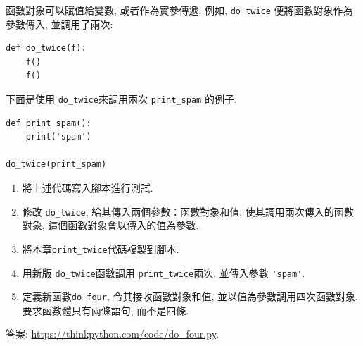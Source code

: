\documentclass[10pt]{book}
\begin{document}
\begin{exercise}

函數對象可以賦值給變數, 或者作為實參傳遞. 
例如, \verb"do_twice" 便將函數對象作為參數傳入, 並調用了兩次:

\begin{verbatim}
def do_twice(f):
    f()
    f()
\end{verbatim}

下面是使用 \verb"do_twice"來調用兩次 \verb"print_spam" 的例子. 

\begin{verbatim}
def print_spam():
    print('spam')

do_twice(print_spam)
\end{verbatim}

\begin{enumerate}

\item 將上述代碼寫入腳本進行測試.

\item 修改 \verb"do_twice", 給其傳入兩個參數：函數對象和值, 
使其調用兩次傳入的函數對象, 這個函數對象會以傳入的值為參數.

\item 將本章\verb"print_twice"代碼複製到腳本.

\item 用新版 \verb"do_twice"函數調用 \verb"print_twice"兩次, 
並傳入參數 \verb"'spam'".

\item 定義新函數\verb"do_four", 令其接收函數對象和值, 
並以值為參數調用四次函數對象. 
要求函數體只有兩條語句, 而不是四條. 

\end{enumerate}

答案: \url{https://thinkpython.com/code/do_four.py}.

\end{exercise}
\end{document}
